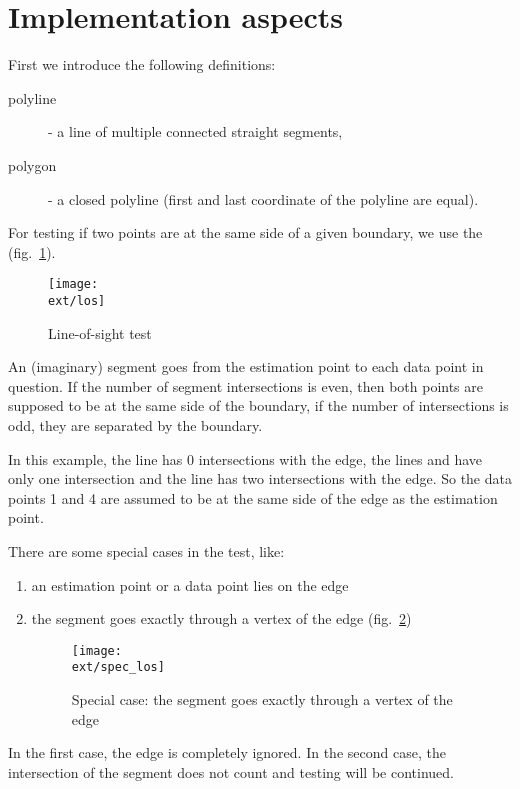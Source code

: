 \section{Implementation aspects}
\label{sec:Impl-aspects}

First we introduce the following definitions:
\begin{description}
\item[polyline]  - a line of multiple connected straight segments,
\item[polygon] - a closed polyline (first and last coordinate of
 the polyline are equal).
\end{description}

For testing if two points are at the same side of a given boundary, we
use the \lost{} (fig.~\ref{fig:los}).

\begin{figure}[htbp]
  \centering
  \texttt{[image: \\ext/los]}
  \caption{Line-of-sight test}
  \label{fig:los}
\end{figure}

An (imaginary) segment goes from the estimation point to each data
point in question. If the number of segment intersections is even,
then both points are supposed to be at the same side of the boundary,
if the number of intersections is odd, they are separated by the
boundary.

In this example, the line  has 0 intersections with the
edge, the lines  and  have only one
intersection and the line  has two intersections with the
edge. So the data points 1 and 4 are assumed to be at the same side of
the edge as the estimation point.

There are some special cases in the test, like:
\begin{enumerate}
\item an estimation point or a data point lies on the edge
\item the segment goes exactly through a vertex of the edge (fig.~\ref{fig:spec_los})
  \begin{figure}[htbp]
    \centering
    \texttt{[image: \\ext/spec\_los]}
    \caption{Special case:  the segment goes exactly through a vertex of the edge}
    \label{fig:spec_los}
  \end{figure}
\end{enumerate}

In the first case, the edge is completely ignored. In the second case,
the intersection of the segment does not count and testing will be
continued.

